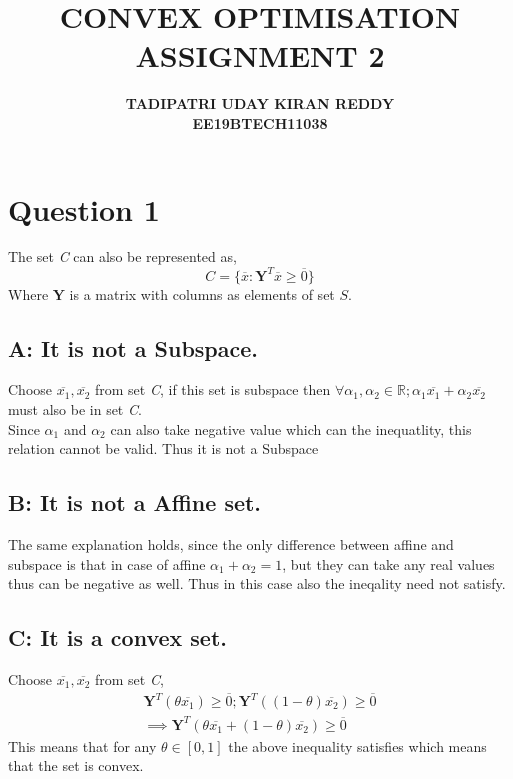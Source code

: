 \documentclass{article}
\begin{document}
\title{\textbf{CONVEX OPTIMISATION}\\{\textbf{ASSIGNMENT 2}}}
\author{\textbf{TADIPATRI UDAY KIRAN REDDY}\\\textbf{EE19BTECH11038}}
\maketitle

\section*{\hfil Question 1}
The set \textit{C} can also be represented as,
\begin{equation*}
	C = \{\overline{x}: \mathbf{Y}^T\overline{x} \ge \overline{0}\}
\end{equation*}
Where $\mathbf{Y}$ is a matrix with columns as elements of set $S$.
\subsection*{A: It is not a Subspace.}
Choose $\overline{x_1}, \overline{x_2}$ from set \textit{C}, if this set is subspace then $\forall \alpha _1, \alpha _2 \in \mathbb{R}; \alpha _1\overline{x_1} + \alpha _2\overline{x_2}$ must also be in set \textit{C}.\\
Since $\alpha _1$ and $\alpha _2$ can also take negative value which can the inequatlity, this relation cannot be valid. Thus it is not a Subspace

\subsection*{B: It is not a Affine set.}
The same explanation holds, since the only difference between affine and subspace is that in case of affine $\alpha _1 + \alpha _2 = 1$, but they can take any real values thus can be negative as well. Thus in this case also the ineqality need not satisfy.


\subsection*{C: It is a convex set.}
Choose $\overline{x_1}, \overline{x_2}$ from set \textit{C},
\begin{gather*}
	\mathbf{Y}^T(\theta \overline{x_1}) \ge \overline{0}; \mathbf{Y}^T((1 - \theta )\overline{x_2}) \ge \overline{0}\\
	\implies \mathbf{Y}^T(\theta \overline{x_1} + (1 - \theta )\overline{x_2}) \ge \overline{0}
\end{gather*}
This means that for any $\theta \in [0, 1]$ the above inequality satisfies which means that the set is convex.
\end{document}
